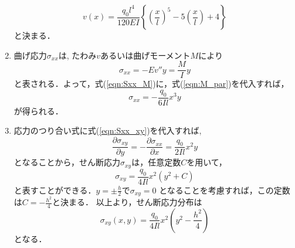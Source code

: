\documentclass[10pt,a4j]{jarticle}
\begin{document}
\begin{enumerate}
\begin{equation}
	v(x) = 
	\frac{q_0l^4}{120EI}\left\{
		\left(\frac{x}{l}\right)^5
		-
		5
		\left(\frac{x}{l}\right) 
		+ 
		4
	\right\}
	\label{eqn:v_par}
\end{equation}
と決まる．
\item
曲げ応力$\sigma_{xx}$は, たわみ$v$あるいは曲げモーメント$M$により
\begin{equation}
	\sigma_{xx}=-Ev''y= \frac{M}{I}y 
	\label{eqn:Sxx_M}
\end{equation}
と表される．よって，式(\ref{eqn:Sxx_M})に，式(\ref{eqn:M_par})を代入すれば，
\begin{equation}
	\sigma_{xx}=
	-\frac{q_0}{6Il}x^3y
	\label{eqn:Sxx_xy}
\end{equation}
が得られる．
\item
応力のつり合い式に式(\ref{eqn:Sxx_xy})を代入すれば, 
\begin{equation}
	\frac{\partial \sigma_{xy}}{\partial y}
	=
	-\frac{\partial \sigma_{xx}}{\partial x}
	=
	\frac{q_0}{2Il}x^2y
	\label{eqn:ODE}
\end{equation}
となることから，せん断応力$\sigma_{xy}$は，任意定数$C$を用いて，
\begin{equation}
	\sigma_{xy}=
	\frac{q_0}{4Il}x^2(y^2+C)
	\label{eqn:Sxy_gen}
\end{equation}
と表すことができる．$y=\pm \frac{h}{2}$で$\sigma_{xy}=0$
となることを考慮すれば，この定数は$C=-\frac{h^2}{4}$と決まる．
以上より，せん断応力分布は
\begin{equation}
	\sigma_{xy}(x,y) 
	= 
	\frac{q_0}{4Il}x^2\left( 
		y^2 -\frac{h^2}{4}
	\right)
\end{equation}
となる．
\end{enumerate}
\end{document}
